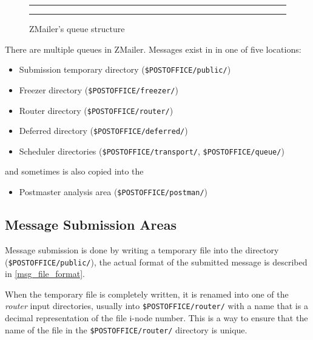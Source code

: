 


\begin{figure*}[ht]
\hrule\medskip
{}
\medskip\hrule\medskip
\caption{ZMailer's queue structure}
\label{fig:adm:queues1}
\end{figure*}

There are multiple queues in ZMailer. Messages exist in
in one of five locations:

\begin{itemize}\sloppy
\item
Submission temporary directory ({\tt \$POSTOFFICE/public/})
\item
Freezer directory ({\tt \$POSTOFFICE/freezer/})
\item
Router directory ({\tt \$POSTOFFICE/router/})
\item
Deferred directory ({\tt \$POSTOFFICE/deferred/})
\item
Scheduler directories ({\tt \$POSTOFFICE/transport/}, 
{\tt \$POSTOFFICE/queue/})
\end{itemize}

and sometimes is also copied into the 
\begin{itemize}
\item Postmaster analysis area ({\small\tt \$POSTOFFICE/postman/})
\end{itemize}



\subsection{Message Submission Areas}



Message submission is done by writing a temporary file
into the directory ({\tt \$POSTOFFICE/public/}), the 
actual format of the submitted message is described in
\vref{msg_file_format}.

When the temporary file is completely written, it is renamed into one 
of the {\em router} input directories, usually into 
{\tt \$POSTOFFICE/router/} with a name that is a decimal representation
of the file i-node number. This is a way to ensure that the
name of the file in the {\tt \$POSTOFFICE/router/} directory is unique.

